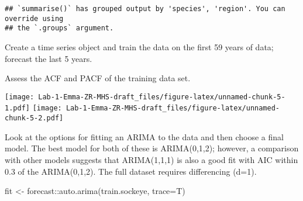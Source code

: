 \documentclass[
]{article}
\newenvironment{Shaded}{\begin{snugshade}}{\end{snugshade}}
\newcommand{\AttributeTok}[1]{\textcolor[rgb]{0.77,0.63,0.00}{#1}}
\newcommand{\DecValTok}[1]{\textcolor[rgb]{0.00,0.00,0.81}{#1}}
\newcommand{\FunctionTok}[1]{\textcolor[rgb]{0.00,0.00,0.00}{#1}}
\newcommand{\NormalTok}[1]{#1}
\newcommand{\OtherTok}[1]{\textcolor[rgb]{0.56,0.35,0.01}{#1}}
\newcommand{\SpecialCharTok}[1]{\textcolor[rgb]{0.00,0.00,0.00}{#1}}
\begin{document}
\begin{verbatim}
## `summarise()` has grouped output by 'species', 'region'. You can override using
## the `.groups` argument.
\end{verbatim}

Create a time series object and train the data on the first 59 years of
data; forecast the last 5 years.

\begin{Shaded}
\end{Shaded}

Assess the ACF and PACF of the training data set.

\texttt{[image: Lab-1-Emma-ZR-MHS-draft\_files/figure-latex/unnamed-chunk-5-1.pdf]}
\texttt{[image: Lab-1-Emma-ZR-MHS-draft\_files/figure-latex/unnamed-chunk-5-2.pdf]}

Look at the options for fitting an ARIMA to the data and then choose a
final model. The best model for both of these is ARIMA(0,1,2); however,
a comparison with other models suggests that ARIMA(1,1,1) is also a good
fit with AIC within 0.3 of the ARIMA(0,1,2). The full dataset requires
differencing (d=1).

\begin{Shaded}
\begin{Highlighting}[]
\NormalTok{fit }\OtherTok{\textless{}{-}}\NormalTok{ forecast}\SpecialCharTok{::}\FunctionTok{auto.arima}\NormalTok{(train.sockeye, }\AttributeTok{trace=}\NormalTok{T)}
\end{Highlighting}
\end{Shaded}
\end{document}
